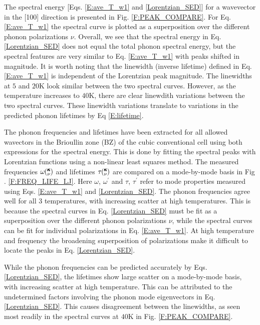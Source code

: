 \documentclass[twocolumn,10pt]{asme2e}
\newcommand{\kv}{\mspace{-4.0mu}\left(\mspace{-8.0mu}\begin{smallmatrix}&\pmb{\kappa} \\&\nu\end{smallmatrix}\mspace{-3.0mu}\right)}
\begin{document}
The spectral energy [Eqs$.$ \eqref{E:ave_T_w1} and \eqref{Lorentzian_SED}] for a wavevector in the [100] direction is presented in Fig$.$ \ref{F:PEAK_COMPARE}. For Eq$.$ \eqref{E:ave_T_w1} the spectral curve is plotted as a superposition over the different phonon polarizations $\nu$.  Overall, we see that the spectral energy in Eq$.$ \eqref{Lorentzian_SED} does not equal the total phonon spectral energy, but the spectral features are very similar to Eq$.$ \eqref{E:ave_T_w1} with peaks shifted in magnitude. It is worth noting that the linewidth (inverse lifetime) defined in Eq$.$ \eqref{E:ave_T_w1} is independent of the Lorentzian peak magnitude. The linewidths at $5$ and $20$K look similar between the two spectral curves. However, as the temperature increases to $40$K, there are clear linewdith variations between the two spectral curves. These linewidth variations translate to variations in the predicted phonon lifetimes by Eq \eqref{E:lifetime}.

The phonon frequencies and lifetimes have been extracted for all allowed wavectors in the Brioullin zone (BZ) of the cubic conventional cell using both expressions for the spectral energy. This is done by fitting the spectral peaks with Lorentzian functions using a non-linear least squares method. The measured frequencies $\omega\kv$ and lifetimes $\tau\kv$ are compared on a mode-by-mode basis in Fig$.$ \ref{F:FREQ_LIFE_LJ}. Here $\omega$, $\omega^{'}$ and $\tau$, $\tau^{'}$  refer to mode properties measured using Eqs$.$ \eqref{E:ave_T_w1} and \eqref{Lorentzian_SED}. The phonon frequencies agree well for all 3 temperatures, with increasing scatter at high temperatures.  This is because the spectral curves in Eq$.$ \eqref{Lorentzian_SED} must be fit as a superposition over the different phonon polarizations $\nu$, while the spectral curves can be fit for individual polarizations in Eq$.$ \eqref{E:ave_T_w1}. At high temperature and frequency the broadening superposition of polarizations make it difficult to locate the peaks in Eq$.$ \eqref{Lorentzian_SED}.

While the phonon frequencies can be predicted accurately by Eqs$.$ \eqref{Lorentzian_SED}, the lifetimes show large scatter on a mode-by-mode basis, with increasing scatter at high temperature.  This can be attributed to the undetermined factors involving the phonon mode eigenvectors in Eq$.$ \eqref{Lorentzian_SED}. This causes disagreement between the linewidths, as seen most readily in the spectral curves at $40$K in Fig. \ref{F:PEAK_COMPARE}.
\end{document}
